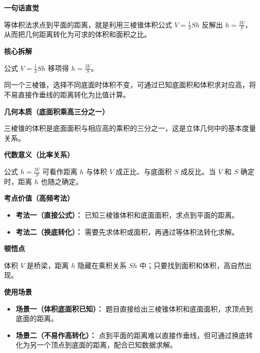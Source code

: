 \begin{explanationbox}

	\textbf{\textcolor{CExplanation}{一句话直觉}}

	等体积法求点到平面的距离，就是利用三棱锥体积公式 $V=\frac13 S h$ 反解出 $h=\frac{3V}{S}$，从而把几何距离转化为可求的体积和面积之比。

	\medskip

	\textbf{\textcolor{CExplanation}{核心拆解}}

	\begin{description}[style=nextline, leftmargin=2.8em, labelsep=0.5em, itemsep=0.45em]
		\item[\textbf{要点一（体积公式逆用）：}]
		      公式 $V=\frac13 S h$ 移项得 $h = \frac{3V}{S}$。

		\item[\textbf{要点二（等体积换底）：}]
		      同一个三棱锥，选择不同底面时体积不变，可通过已知底面积和体积求对应高，将不易直接作垂线的距离转化为比值计算。
	\end{description}

	\medskip

	\textbf{\textcolor{CExplanation}{几何本质（底面积乘高三分之一）}}

	三棱锥的体积是底面面积与相应高的乘积的三分之一，这是立体几何中的基本度量关系。

	\medskip

	\textbf{\textcolor{CExplanation}{代数意义（比率关系）}}

	公式 $h = \frac{3V}{S}$ 可看作距离 $h$ 与体积 $V$ 成正比、与底面积 $S$ 成反比。当 $V$ 和 $S$ 确定时，距离 $h$ 也随之确定。

	\medskip

	\textbf{\textcolor{CExplanation}{考点价值（高频考法）}}

	\begin{itemize}[leftmargin=*, itemsep=0.5em, topsep=0.4em]
		\item \textbf{考法一（直接公式）：} 已知三棱锥体积和底面面积，求点到平面的距离。
		\item \textbf{考法二（换底转化）：} 需要先求体积或面积，再通过等体积法转化求解。
	\end{itemize}

	\medskip

	\textbf{\textcolor{CExplanation}{顿悟点}}

	体积 $V$ 是桥梁，距离 $h$ 隐藏在乘积关系 $Sh$ 中；只要找到面积和体积，高自然出现。

	\medskip

	\textbf{\textcolor{CExplanation}{使用场景}}

	\begin{itemize}[leftmargin=*, itemsep=0.5em, topsep=0.4em]
		\item \textbf{场景一（体积底面积已知）：} 题目直接给出三棱锥体积和底面面积，求顶点到底面的距离。
		\item \textbf{场景二（不易作高转化）：} 点到平面的距离难以直接作垂线，但可通过换底转化为另一个顶点到底面的距离，配合已知数据求解。
	\end{itemize}

\end{explanationbox}
